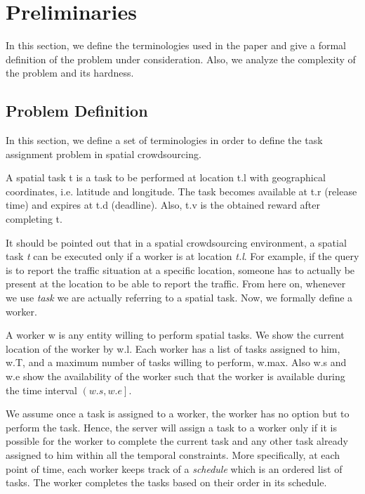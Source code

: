 \section{Preliminaries}

In this section, we define the terminologies used in the paper and give a formal definition of the problem under consideration. Also, we analyze the complexity of the problem and its hardness.

\subsection{Problem Definition}
\label{subsec:problemdef}

In this section, we define a set of terminologies in order to define the task assignment problem in spatial crowdsourcing.

\begin{definition} 
A spatial task t is a task to be performed at location t.l with geographical coordinates, i.e. latitude and longitude. The task becomes available at t.r (release time) and expires at t.d (deadline). Also, t.v is the obtained reward after completing t.
\end{definition}

It should be pointed out that in a spatial crowdsourcing environment, a spatial task \emph{t} can be executed only if a worker is at location \emph{t.l}. For example, if the query is to report the traffic situation at a specific location, someone has to actually be present at the location to be able to report the traffic. From here on, whenever we use \emph{task} we are actually referring to a spatial task. Now, we formally define a worker.

\begin{definition} [Worker]
A worker w is any entity willing to perform spatial tasks. We show the current location of the worker by w.l. Each worker has a list of tasks assigned to him, w.T, and a maximum number of tasks willing to perform, w.max. Also w.s and w.e show the availability of the worker such that the worker is available during the time interval $\left( w.s, w.e \right]$.
\end{definition}

We assume once a task is assigned to a worker, the worker has no option but to perform the task. Hence, the server will assign a task to a worker only if it is possible for the worker to complete the current task and any other task already assigned to him within all the temporal constraints. More specifically, at each point of time, each worker keeps track of a \textit{schedule} which is an ordered list of tasks. The worker completes the tasks based on their order in its schedule.


